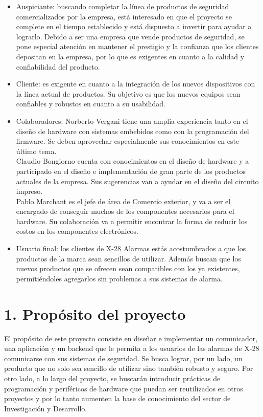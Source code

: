 \documentclass[
11pt, %
codirector, %
]{charter}
\begin{document}
\begin{itemize}
	\item Auspiciante: buscando completar la línea de productos de seguridad comercializados por la
empresa, está interesado en que el proyecto se complete en el tiempo establecido y está dispuesto a
invertir para ayudar a lograrlo. Debido a ser una empresa que vende productos de seguridad, se pone
especial atención en mantener el prestigio y la confianza que los clientes depositan en la empresa, por
lo que es exigentes en cuanto a la calidad y confiabilidad del producto.
	\item Cliente: es exigente en cuanto a la integración de los nuevos dispositivos con la línea actual de productos. Su objetivo es que los nuevos equipos sean confiables y robustos en cuanto a su usabilidad.
	\item Colaboradores: Norberto Vergani tiene una amplia experiencia tanto en el diseño de hardware con
sistemas embebidos como con la programación del firmware. Se deben aprovechar especialmente sus
conocimientos en este último tema.\\
Claudio Bongiorno cuenta con conocimientos en el diseño de hardware y a participado en el diseño e implementación de gran parte de los productos actuales de la empresa. Sus sugerencias van a ayudar en el diseño del circuito impreso.\\
Pablo Marchant es el jefe de área de Comercio exterior, y va a ser el encargado de conseguir muchos de
los componentes necesarios para el hardware. Su colaboración va a permitir encontrar la forma de reducir los costos en los componentes electrónicos.
	\item Usuario final: los clientes de X-28 Alarmas estás acostumbrados a que los productos de la marca sean sencillos de utilizar. Además buscan que los nuevos productos que se ofrecen sean compatibles con los ya existentes, permitiéndoles agregarlos sin problemas a sus sistemas de alarma.
\end{itemize}




\section{1. Propósito del proyecto}
\label{sec:proposito}

El propósito de este proyecto consiste en diseñar e implementar un comunicador, una aplicación y un backend que le permita a los usuarios de las alarmas de X-28 comunicarse con sus sistemas de seguridad. Se busca lograr, por un lado, un producto que no solo sea sencillo de utilizar sino también robusto y seguro. Por otro lado, a lo largo del proyecto, se buscarán introducir prácticas de programación y periféricos de hardware que puedan ser reutilizados en otros proyectos  y por lo tanto aumenten la base de conocimiento del sector de Investigación y Desarrollo.
\end{document}
